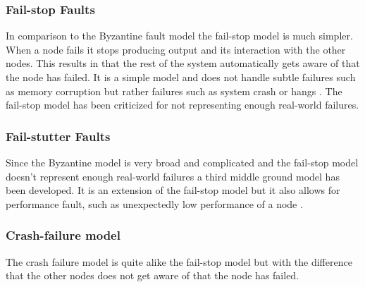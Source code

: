 \documentclass{cslthse-msc}
\begin{document}

\subsubsection*{Fail-stop Faults}
In comparison to the Byzantine fault model the fail-stop model is much simpler. When a node fails it stops producing output and its interaction with the other nodes. This results in that the rest of the system automatically gets aware of that the node has failed. It is a simple model and does not handle subtle failures such as memory corruption but rather failures such as system crash or hangs \cite{surveyFaultParallel}. The fail-stop model has been criticized for not representing enough real-world failures.


\subsubsection*{Fail-stutter Faults}
Since the Byzantine model is very broad and complicated and the fail-stop model doesn't represent enough real-world failures a third middle ground model has been developed. It is an extension of the fail-stop model but it also allows for performance fault, such as unexpectedly low performance of a node \cite{surveyFaultParallel}.

\subsubsection*{Crash-failure model}
The crash failure model is quite alike the fail-stop model but with the difference that the other nodes does not get aware of that the node has failed.
\end{document}
